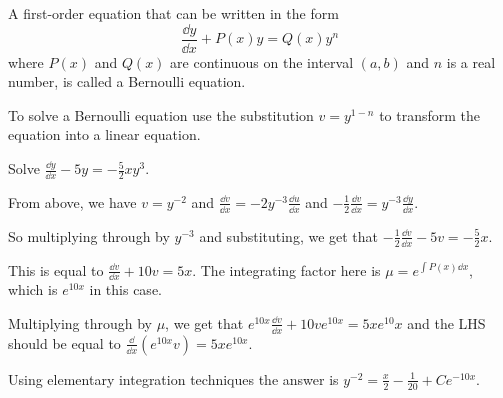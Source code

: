\documentclass[../diffeq.tex]{subfiles}
\begin{document}
\begin{definition}
    A first-order equation that can be written in the form 
    \[ \frac{\dd y}{\dd x}+P(x)y=Q(x)y^n \]
    where $P(x)$ and $Q(x)$ are continuous on the interval $(a,b)$ and $n$ is a real number, is called a Bernoulli equation.
\end{definition}

To solve a Bernoulli equation use the substitution $v=y^{1-n}$ to transform the equation into a linear equation.

\pagebreak
\begin{example}
    Solve $\frac{\dd y}{\dd x}-5y=-\frac{5}{2}xy^3$.

    From above, we have $v=y^{-2}$ and $\frac{\dd v}{\dd x}=-2y^{-3}\frac{\dd u}{\dd x}$ and $-\frac{1}{2}\frac{\dd v}{\dd x}=y^{-3}\frac{\dd y}{\dd x}$.

    So multiplying through by $y^{-3}$ and substituting, we get that $-\frac{1}{2}\frac{\dd v}{\dd x}-5v=-\frac{5}{2}x$.

    This is equal to $\frac{\dd v}{\dd x}+10v=5x$. The integrating factor here is $\mu = e^{\int P(x)\dd x}$, which is $e^{10x}$ in this case.

    Multiplying through by $\mu$, we get that $e^{10x}\frac{\dd v}{\dd x}+10ve^{10x}=5xe^{10}x$ and the LHS should be equal to $\frac{\dd}{\dd x}(e^{10x}v)=5xe^{10x}$.

    Using elementary integration techniques the answer is $y^{-2}=\frac{x}{2}-\frac{1}{20}+Ce^{-10x}$.
\end{example}
\end{document}
